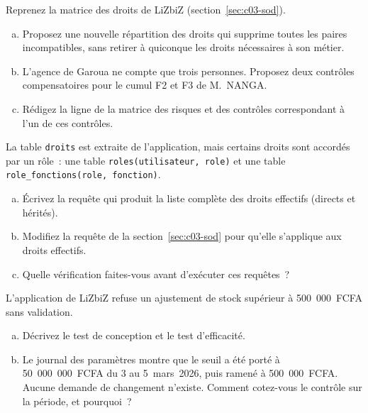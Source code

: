 \begin{boxexo}[title={\ding{45}\quad Exercice~3.4. Corriger la matrice des droits \niveaumoyen}]
Reprenez la matrice des droits de LiZbiZ (section~\ref{sec:c03-sod}).
\begin{enumerate}[(a)]
    \item Proposez une nouvelle répartition des droits qui supprime toutes
          les paires incompatibles, sans retirer à quiconque les droits
          nécessaires à son métier.
    \item L'agence de Garoua ne compte que trois personnes. Proposez deux
          contrôles compensatoires pour le cumul F2 et F3 de M.~NANGA.
    \item Rédigez la ligne de la matrice des risques et des contrôles
          correspondant à l'un de ces contrôles.
\end{enumerate}
\end{boxexo}

\begin{boxexo}[title={\ding{45}\quad Exercice~3.5. La requête des conflits \niveaumoyen}]
La table \texttt{droits} est extraite de l'application, mais certains droits
sont accordés par un rôle~: une table \texttt{roles(utilisateur, role)} et
une table \texttt{role\_fonctions(role, fonction)}.
\begin{enumerate}[(a)]
    \item Écrivez la requête qui produit la liste complète des droits
          effectifs (directs et hérités).
    \item Modifiez la requête de la section~\ref{sec:c03-sod} pour qu'elle
          s'applique aux droits effectifs.
    \item Quelle vérification faites-vous avant d'exécuter ces requêtes~?
\end{enumerate}
\end{boxexo}

\begin{boxexo}[title={\ding{45}\quad Exercice~3.6. Tester un contrôle automatisé \niveaumoyen}]
L'application de LiZbiZ refuse un ajustement de stock supérieur à
500~000~FCFA sans validation.
\begin{enumerate}[(a)]
    \item Décrivez le test de conception et le test d'efficacité.
    \item Le journal des paramètres montre que le seuil a été porté à
          50~000~000~FCFA du 3 au 5~mars~2026, puis ramené à
          500~000~FCFA. Aucune demande de changement n'existe. Comment
          cotez-vous le contrôle sur la période, et pourquoi~?
\end{enumerate}
\end{boxexo}

